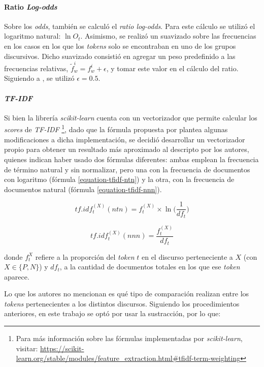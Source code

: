 \paragraph{Ratio \textit{Log-odds}}
Sobre los \textit{odds}, tambi\'en se calcul\'o el \textit{ratio log-odds}.
Para este c\'alculo se utiliz\'o el logaritmo natural: $\ln{O_t}$.
Asimismo, se realiz\'o un suavizado sobre las frecuencias en los casos
en los que los \textit{tokens} solo se encontraban en uno de los grupos
discursivos. Dicho suavizado consisti\'o en agregar un peso predefinido a las
frecuencias relativas, $\tilde{f}^{i}_{w} = f^{i}_{w}+\epsilon$, y tomar
este valor en el c\'alculo del ratio. Siguiendo a \cite{monroe2008fightin},
se utiliz\'o $\epsilon=0.5$.

\paragraph{\textit{TF-IDF}}
\label{paragraph-methods-tfidf}
Si bien la librer\'ia \textit{scikit-learn} cuenta con un vectorizador
que permite calcular los \textit{scores} de \textit{TF-IDF}
\footnote{Para m\'as informaci\'on sobre las f\'ormulas
implementadas por \textit{scikit-learn}, visitar:
\url{https://scikit-learn.org/stable/modules/feature_extraction.html\#tfidf-term-weighting}},
dado que la f\'ormula propuesta por  plantea
algunas modificaciones a dicha implementaci\'on, se decidi\'o
desarrollar un vectorizador propio para obtener un resultado
m\'as aproximado al descripto por los autores, quienes indican haber usado
dos f\'ormulas diferentes: ambas emplean la frecuencia
de t\'ermino natural y sin normalizar, pero una con la frecuencia de documentos
con logaritmo (f\'ormula \ref{equation-tfidf-ntn}) y la otra, con la frecuencia
de documentos natural (f\'ormula \ref{equation-tfidf-nnn}).

\begin{equation}
\label{equation-tfidf-ntn}
    tf.idf_{t}^{(X)}(ntn) = f_{t}^{(X)} \times \ln\bigg({\frac{1}{df_{t}}}\bigg)
\end{equation}

\begin{equation}
\label{equation-tfidf-nnn}
    tf.idf_{t}^{(X)}(nnn) = \frac{f_{t}^{(X)}}{df_{t}}
\end{equation}

donde $f_{t}^{X}$ refiere a la proporci\'on del \textit{token} $t$
en el discurso perteneciente a $X$
(con $X \in \lbrace P,N \rbrace$) y $df_t$, a la cantidad
de documentos totales en los que ese \textit{token} aparece.
\par
Lo que los autores no mencionan es qu\'e tipo de comparaci\'on realizan
entre los \textit{tokens} pertenecientes a los distintos discursos.
Siguiendo los procedimientos anteriores, en este trabajo se opt\'o por usar
la sustracci\'on, por lo que:

